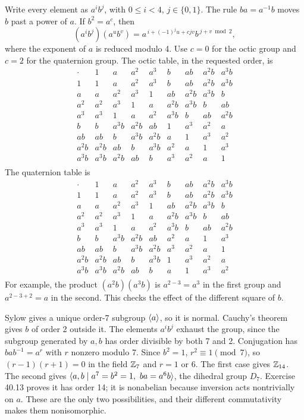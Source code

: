 \idea Write every element as $a^ib^j$, with $0\le i<4$, $j\in\{0,1\}$. The rule $ba=a^{-1}b$ moves $b$ past a power of $a$. If $b^2=a^c$, then
\[
(a^ib^j)(a^ub^v)=a^{\,i+(-1)^ju+cjv}b^{\,j+v\bmod2},
\]
where the exponent of $a$ is reduced modulo 4. Use $c=0$ for the octic group and $c=2$ for the quaternion group.
The octic table, in the requested order, is
\[\begin{array}{c|cccccccc}\cdot&1&a&a^2&a^3&b&ab&a^2b&a^3b\\\hline
1&1&a&a^2&a^3&b&ab&a^2b&a^3b\\
a&a&a^2&a^3&1&ab&a^2b&a^3b&b\\
a^2&a^2&a^3&1&a&a^2b&a^3b&b&ab\\
a^3&a^3&1&a&a^2&a^3b&b&ab&a^2b\\
b&b&a^3b&a^2b&ab&1&a^3&a^2&a\\
ab&ab&b&a^3b&a^2b&a&1&a^3&a^2\\
a^2b&a^2b&ab&b&a^3b&a^2&a&1&a^3\\
a^3b&a^3b&a^2b&ab&b&a^3&a^2&a&1\\\end{array}\]The quaternion table is
\[\begin{array}{c|cccccccc}\cdot&1&a&a^2&a^3&b&ab&a^2b&a^3b\\\hline
1&1&a&a^2&a^3&b&ab&a^2b&a^3b\\
a&a&a^2&a^3&1&ab&a^2b&a^3b&b\\
a^2&a^2&a^3&1&a&a^2b&a^3b&b&ab\\
a^3&a^3&1&a&a^2&a^3b&b&ab&a^2b\\
b&b&a^3b&a^2b&ab&a^2&a&1&a^3\\
ab&ab&b&a^3b&a^2b&a^3&a^2&a&1\\
a^2b&a^2b&ab&b&a^3b&1&a^3&a^2&a\\
a^3b&a^3b&a^2b&ab&b&a&1&a^3&a^2\\\end{array}\]
For example, the product $(a^2b)(a^3b)$ is $a^{2-3}=a^3$ in the first group and $a^{2-3+2}=a$ in the second. This checks the effect of the different square of $b$.

Sylow gives a unique order-7 subgroup $\langle a\rangle$, so it is normal. Cauchy's theorem gives $b$ of order 2 outside it. The elements $a^ib^j$ exhaust the group, since the subgroup generated by $a,b$ has order divisible by both 7 and 2.
Conjugation has $bab^{-1}=a^r$ with $r$ nonzero modulo 7. Since $b^2=1$, $r^2\equiv1\pmod7$, so $(r-1)(r+1)=0$ in the field $\mathbb{Z}_7$ and $r=1$ or $6$.
The first case gives $\mathbb{Z}_{14}$. The second gives
$\gen{a,b\mid a^7=b^2=1,\ ba=a^6b}$, the dihedral group $D_7$. Exercise 40.13 proves it has order 14; it is nonabelian because inversion acts nontrivially on $a$.
These are the only two possibilities, and their different commutativity makes them nonisomorphic.


